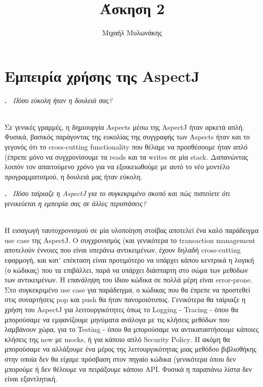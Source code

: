 \documentclass[12pt]{article}
\newcounter{problem}
\newcounter{solution}
\newcommand\Problem{%
  \stepcounter{problem}%
  \textbf{\theproblem.}~%
  \setcounter{solution}{0}%
}
\newcommand\TheSolution{%
  \textbf{}\\%
}
\begin{document}
\title{Άσκηση 2}
\author{Μιχαήλ Μυλωνάκης}
\maketitle

\section*{Εμπειρία χρήσης της \textlatin{AspectJ} }

\Problem \textit{Πόσο εύκολη ήταν η δουλειά σας?}

\TheSolution 
Σε γενικές γραμμές, η δημιουργία \textlatin{Aspects} μέσω της \textlatin{AspectJ} ήταν αρκετά απλή. Φυσικά, βασικός παράγοντας της
ευκολίας της συγγραφής των \textlatin{Aspects} ήταν και το γεγονός ότι το \textlatin{cross-cutting functionality} που θέλαμε να προσθέσουμε ήταν απλό
(έπρεπε μόνο να συγχρονίσουμε τα \textlatin{reads} και τα \textlatin{writes} σε μία \textlatin{stack}. Δαπανώντας λοιπόν τον απαιτούμενο 
χρόνο για να εξοικειωθούμε με αυτό το νέο μοντέλο προγραμματισμού, η δουλειά μας ήταν εύκολη.

\Problem \textit{Πόσο ταίριαζε η \textlatin{AspectJ} για το συγκεκριμένο σκοπό και πώς πιστεύετε ότι
γενικεύεται η εμπειρία σας σε άλλες περιστάσεις?}

\TheSolution 
Η εισαγωγή ταυτοχρονισμού σε μία υλοποίηση στοίβας αποτελεί ένα καλό παράδειγμα  \textlatin{use case} της \textlatin{AspectJ}. Ο συγχρονισμός (και γενικότερα το 
\textlatin{transaction management} αποτελούν έννοιες που είναι υπεράνω αντικειμένων, έχουν δηλαδή \textlatin{cross-cutting} εφαρμογή, και κατ' επέκταση είναι 
προτιμότερο να υπάρχει κάπου κεντρικά η λογική (ο κώδικας) που τα επιβάλλει, παρά να υπάρχει διάσπαρτη στο σώμα των μεθόδων των αντικειμένων. Η επανάληψη του ίδιου
κώδικα σε πολλά μέρη είναι \textlatin{error-prone}. Στο συγκεκριμένο \textlatin{use case} για παράδειγμα, ο κώδικας που θα έπρεπε να προστεθεί στις συναρτήσεις
\textlatin{pop} και \textlatin{push} θα ήταν πανομοιότυπος. Γενικότερα θα ταίριαζε η χρήση του \textlatin{AspectJ} για λειτουργικότητες όπως το 
\textlatin{Logging - Tracing} - όπου θα μπορούσαμε να εμφανίζουμε μηνύματα ανάλογα με τις κλήσεις μεθόδων που λαμβάνουν χώρα, για το \textlatin{Testing} - όπου θα
μπορούσαμε να αντικαταστήσουμε κάποιες κλήσεις της \textlatin{new} με \textlatin{mocks}, ή για κάποιο απλό \textlatin{Security Policy}. Η ακόμη θα μπορούσαμε να 
αλλάξουμε ένα μέρος της λειτουργικότητας μιας μεθόδου βιβλιοθήκης στην οποία δεν θα είχαμε πρόσβαση στον πηγαίο κώδικα (γενικότερα όπου δεν μπορούμε ή δεν
θέλουμε να πειράξουμε κάποιο \textlatin{API}. Φυσικά η παραπάνω λίστα δεν είναι εξαντλητική.
\end{document}

